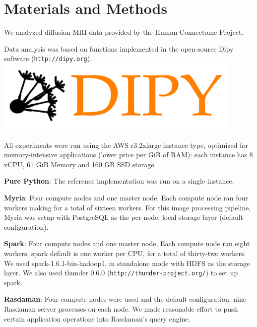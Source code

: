 \documentclass[a0,landscape]{a0poster}
\begin{document}
\begin{multicols}{3}
\begin{itemize}
\end{itemize}


\section*{Materials and Methods}

We analyzed diffusion MRI data provided by the Human Connectome Project.

Data analysis was based on functions implemented in the open-source Dipy
software (\texttt{http://dipy.org}). \\

\includegraphics[width=12cm]{dipy-logo.png}

All experiments were run using the AWS r3.2xlarge instance type, optimized for memory-intensive applications (lower price per GiB of RAM): each instance has 8 vCPU, 61 GiB Memory and 160 GB SSD storage.

\textbf{Pure Python}: The reference implementation was run on a single instance.

\textbf{Myria}:  Four compute nodes and one master node. Each compute node ran
four workers making for a total of sixteen workers. For this image processing
pipeline, Myria was setup with PostgreSQL as the per-node, local storage layer (default configuration).

\textbf{Spark}: Four compute nodes and one master node, Each compute node ran
eight workers; spark default is one worker per CPU, for a total of thirty-two
workers. We used spark-1.6.1-bin-hadoop1, in standalone mode with HDFS as the
storage layer. We also used thunder 0.6.0 (\texttt{http://thunder-project.org/})
to set up spark.


\textbf{Rasdaman}: Four compute nodes were used and the default configuration:
nine Rasdaman server processes on each node. We made reasonable effort to push
certain application operations into Rasdaman’s query engine.



\end{multicols}
\end{document}
